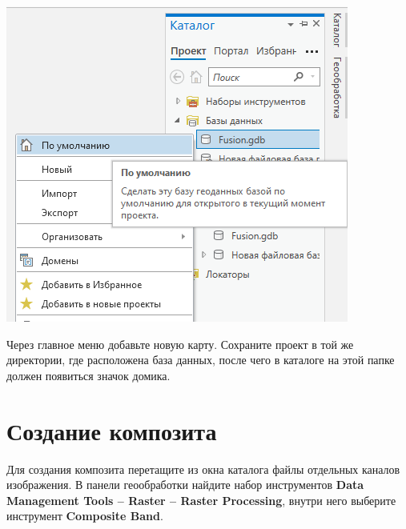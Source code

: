 \documentclass[
  12pt,
]{book}
\begin{document}
\includegraphics{images/Ref01/Default.png}

Через главное меню добавьте новую карту. Сохраните проект в той же директории, где расположена база данных, после чего в каталоге на этой папке должен появиться значок домика.

\hypertarget{pansharpen-composite}{%
\section{Создание композита}\label{pansharpen-composite}}

Для создания композита перетащите из окна каталога файлы отдельных каналов изображения. В панели геообработки найдите набор инструментов \textbf{Data Management Tools -- Raster -- Raster Processing}, внутри него выберите инструмент \textbf{Composite Band}.
\end{document}
